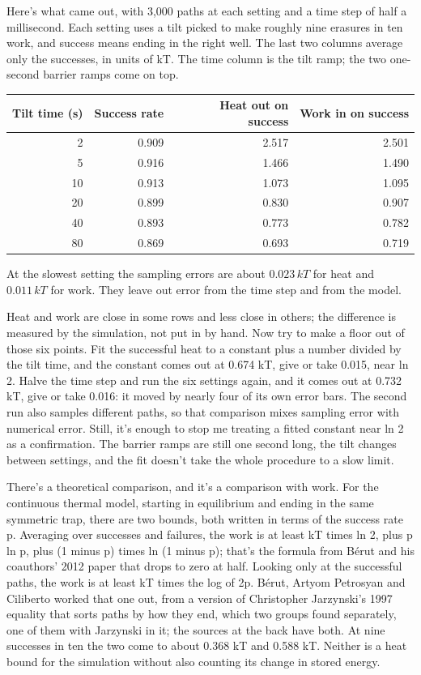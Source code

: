 \documentclass[11pt,twoside]{article}
\theoremstyle{thielethm}
\theoremstyle{thieledef}
\theoremstyle{thieledef}
\theoremstyle{thieledef}
\theoremstyle{thielethm}
\theoremstyle{thieleobs}
\theoremstyle{thielethm}
\begin{document}
Here's what came out, with 3,000 paths at each setting and a time step of half a millisecond. Each setting uses a tilt picked to make roughly nine erasures in ten work, and success means ending in the right well. The last two columns average only the successes, in units of kT. The time column is the tilt ramp; the two one-second barrier ramps come on top.

\begin{center}\small
\begin{tabular}{rrrr}
\toprule
Tilt time (s) & Success rate & Heat out on success & Work in on success\\
\midrule
2  & 0.909 & 2.517 & 2.501\\
5  & 0.916 & 1.466 & 1.490\\
10 & 0.913 & 1.073 & 1.095\\
20 & 0.899 & 0.830 & 0.907\\
40 & 0.893 & 0.773 & 0.782\\
80 & 0.869 & 0.693 & 0.719\\
\bottomrule
\end{tabular}

\footnotesize At the slowest setting the sampling errors are about $0.023\,kT$ for heat and
$0.011\,kT$ for work. They leave out error from the time step and from the model.
\end{center}

Heat and work are close in some rows and less close in others; the difference is measured by the simulation, not put in by hand. Now try to make a floor out of those six points. Fit the successful heat to a constant plus a number divided by the tilt time, and the constant comes out at 0.674 kT, give or take 0.015, near ln 2. Halve the time step and run the six settings again, and it comes out at 0.732 kT, give or take 0.016: it moved by nearly four of its own error bars. The second run also samples different paths, so that comparison mixes sampling error with numerical error. Still, it's enough to stop me treating a fitted constant near ln 2 as a confirmation. The barrier ramps are still one second long, the tilt changes between settings, and the fit doesn't take the whole procedure to a slow limit.

There's a theoretical comparison, and it's a comparison with work. For the continuous thermal model, starting in equilibrium and ending in the same symmetric trap, there are two bounds, both written in terms of the success rate p. Averaging over successes and failures, the work is at least kT times ln 2, plus p ln p, plus (1 minus p) times ln (1 minus p); that's the formula from Bérut and his coauthors' 2012 paper that drops to zero at half. Looking only at the successful paths, the work is at least kT times the log of 2p. Bérut, Artyom Petrosyan and Ciliberto worked that one out, from a version of Christopher Jarzynski's 1997 equality that sorts paths by how they end, which two groups found separately, one of them with Jarzynski in it; the sources at the back have both. At nine successes in ten the two come to about 0.368 kT and 0.588 kT. Neither is a heat bound for the simulation without also counting its change in stored energy.
\end{document}
